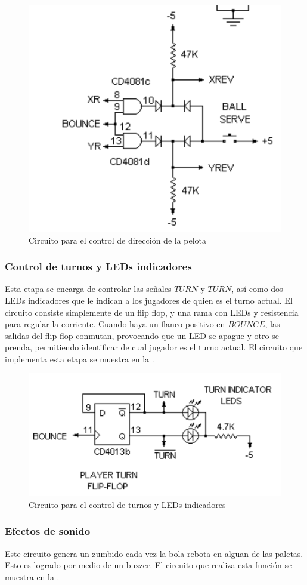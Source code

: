 \begin{figure}[H]
    \centering
    \includegraphics[width=0.5\linewidth]{figs/descripcion/controlPelota.png}
    \caption{Circuito para el control de dirección de la pelota \cite{pong}}
    \label{controlPelota}
\end{figure}

\subsubsection{Control de turnos y LEDs indicadores}
Esta etapa se encarga de controlar las señales $TURN$ y $\overline{TURN}$, así como dos LEDs indicadores que le indican a los jugadores de quien es el turno actual. 
El circuito consiste simplemente de un flip flop, y una rama con LEDs y resistencia para regular la corriente. 
Cuando haya un flanco positivo en $BOUNCE$, las salidas del flip flop conmutan, provocando que un LED se apague y otro se prenda, permitiendo identificar de cual jugador es el turno actual.
El circuito que implementa esta etapa se muestra en la .

\begin{figure}[H]
    \centering
    \includegraphics[width=0.5\linewidth]{figs/descripcion/turnos.png}
    \caption{Circuito para el control de turnos y LEDs indicadores \cite{pong}}
    \label{turnos}
\end{figure}

\subsubsection{Efectos de sonido}
Este circuito genera un zumbido cada vez la bola rebota en alguan de las paletas.
Esto es logrado por medio de un buzzer.
El circuito que realiza esta función se muestra en la .

